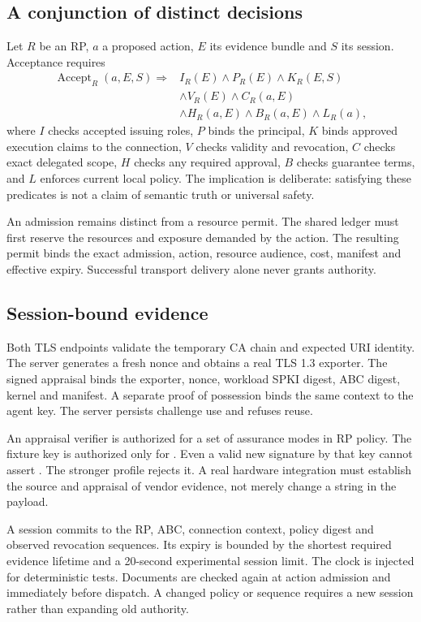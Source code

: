 \documentclass[journal,10pt]{IEEEtran}
\newcommand{\code}[1]{\texttt{\detokenize{#1}}}
\newcommand{\AND}{\mathbin{\wedge}}
\begin{document}
\subsection{A conjunction of distinct decisions}
Let $R$ be an RP, $a$ a proposed action, $E$ its evidence bundle and $S$ its session. Acceptance requires
\begin{align}
\operatorname{Accept}_{R}(a,E,S) \Rightarrow {}&
 I_R(E) \AND P_R(E) \AND K_R(E,S) \nonumber\\
 &\AND V_R(E) \AND C_R(a,E) \nonumber\\
 &\AND H_R(a,E) \AND B_R(a,E) \AND L_R(a),
\end{align}
where $I$ checks accepted issuing roles, $P$ binds the principal, $K$ binds approved execution claims to the connection, $V$ checks validity and revocation, $C$ checks exact delegated scope, $H$ checks any required approval, $B$ checks guarantee terms, and $L$ enforces current local policy. The implication is deliberate: satisfying these predicates is not a claim of semantic truth or universal safety.

An admission remains distinct from a resource permit. The shared ledger must first reserve the resources and exposure demanded by the action. The resulting permit binds the exact admission, action, resource audience, cost, manifest and effective expiry. Successful transport delivery alone never grants authority.

\subsection{Session-bound evidence}
Both TLS endpoints validate the temporary CA chain and expected URI identity. The server generates a fresh nonce and obtains a real TLS 1.3 exporter. The signed appraisal binds the exporter, nonce, workload SPKI digest, ABC digest, kernel and manifest. A separate proof of possession binds the same context to the agent key. The server persists challenge use and refuses reuse.

An appraisal verifier is authorized for a set of assurance modes in RP policy. The fixture key is authorized only for \code{software-test}. Even a valid new signature by that key cannot assert \code{hardware}. The stronger profile rejects it. A real hardware integration must establish the source and appraisal of vendor evidence, not merely change a string in the payload.

A session commits to the RP, ABC, connection context, policy digest and observed revocation sequences. Its expiry is bounded by the shortest required evidence lifetime and a 20-second experimental session limit. The clock is injected for deterministic tests. Documents are checked again at action admission and immediately before dispatch. A changed policy or sequence requires a new session rather than expanding old authority.
\end{document}
